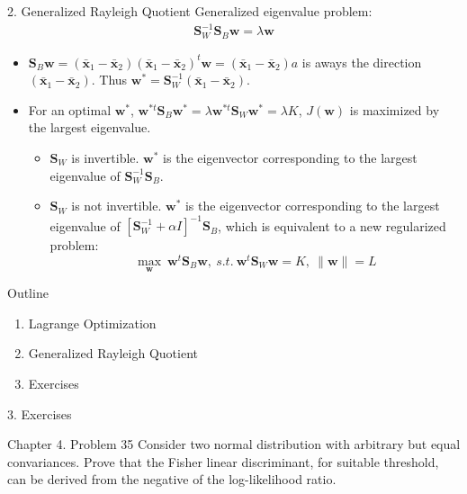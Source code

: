 \documentclass[compress,blue]{beamer}
\newcommand{\bx}{\mathbf{x}}
\newcommand{\bw}{\mathbf{w}}
\newcommand{\bS}{\mathbf{S}}
\begin{document}
\begin{frame}{2. Generalized Rayleigh Quotient}
	Generalized eigenvalue problem:
	\begin{align}
		\bS^{-1}_W\bS_B\bw = \lambda\bw
	\end{align}
	\vspace{-0.2in}
	\begin{itemize}
		\item $\bS_B\bw = (\bar{\bx}_1 - \bar{\bx}_2)(\bar{\bx}_1 - \bar{\bx}_2)^t\bw = (\bar{\bx}_1 - \bar{\bx}_2)a$ is aways the direction $(\bar{\bx}_1 - \bar{\bx}_2)$. Thus $\bw^* = \bS^{-1}_W(\bar{\bx}_1 - \bar{\bx}_2)$.
		\item For an optimal $\bw^*$, $\bw^{*t}\bS_B\bw^* = \lambda\bw^{*t}\bS_W\bw^{*} = \lambda K$, $J(\bw)$ is maximized by the largest eigenvalue. 
		\begin{itemize}
			\item $\bS_W$ is invertible. $\bw^*$ is the eigenvector corresponding to the largest eigenvalue of $\bS^{-1}_W\bS_B$.
			\item $\bS_W$ is not invertible. $\bw^*$ is the eigenvector corresponding to the largest eigenvalue of $[\bS^{-1}_W+\alpha I]^{-1}\bS_B$, which is equivalent to a new regularized problem:\\
			$$\max_{\bw}~ \bw^t\bS_B\bw, ~s.t.~ \bw^t\bS_W\bw = K, ~ \|\bw\|=L$$
		\end{itemize}
	\end{itemize}
\end{frame}

\begin{frame}{Outline}
	\begin{enumerate}
		\item<1-2> Lagrange Optimization
		\vspace{0.1in}
		\item<1-2> Generalized Rayleigh Quotient 
		\vspace{0.1in}
		\item<2> Exercises 
	\end{enumerate}
\end{frame}

\begin{frame}{3. Exercises}
	\begin{block}{Chapter 4. Problem 35}
		Consider two normal distribution with arbitrary but equal convariances. Prove that the Fisher linear discriminant, for suitable threshold, can be derived from the negative of the log-likelihood ratio. 
	\end{block}
\end{frame}
\end{document}
